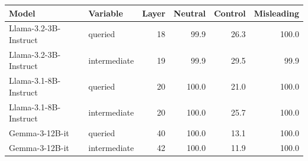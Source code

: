 \begin{tabular}{@{}llrrrr@{}}
\toprule
Model & Variable & Layer & Neutral & Control & Misleading \\
\midrule
Llama-3.2-3B-Instruct & queried & 18 & 99.9 & 26.3 & 100.0 \\
Llama-3.2-3B-Instruct & intermediate & 19 & 99.9 & 29.5 & 99.9 \\
Llama-3.1-8B-Instruct & queried & 20 & 100.0 & 21.0 & 100.0 \\
Llama-3.1-8B-Instruct & intermediate & 20 & 100.0 & 25.7 & 100.0 \\
Gemma-3-12B-it & queried & 40 & 100.0 & 13.1 & 100.0 \\
Gemma-3-12B-it & intermediate & 42 & 100.0 & 11.9 & 100.0 \\
\bottomrule
\end{tabular}
